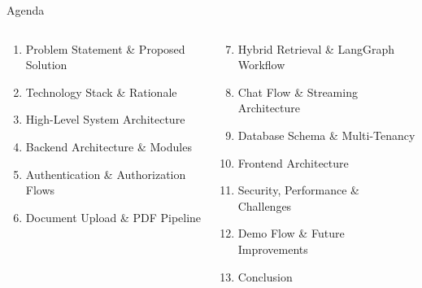 \documentclass[aspectratio=169,12pt]{beamer}
\begin{document}
\begin{frame}{Agenda}
\begin{columns}[T]
  \begin{tcolorbox}[mybox,title={\faList\; Part I — Problem \& Design}]
    \footnotesize
    \begin{enumerate}
      \item Problem Statement \& Proposed Solution
      \item Technology Stack \& Rationale
      \item High-Level System Architecture
      \item Backend Architecture \& Modules
      \item Authentication \& Authorization Flows
      \item Document Upload \& PDF Pipeline
    \end{enumerate}
  \end{tcolorbox}

  \begin{tcolorbox}[mybox,title={\faList\; Part II — Core Systems}]
    \footnotesize
    \begin{enumerate}\setcounter{enumi}{6}
      \item Hybrid Retrieval \& LangGraph Workflow
      \item Chat Flow \& Streaming Architecture
      \item Database Schema \& Multi-Tenancy
      \item Frontend Architecture
      \item Security, Performance \& Challenges
      \item Demo Flow \& Future Improvements
      \item Conclusion
    \end{enumerate}
  \end{tcolorbox}
\end{columns}

\vspace{8pt}
\begin{center}
\end{center}
\end{frame}
\end{document}
